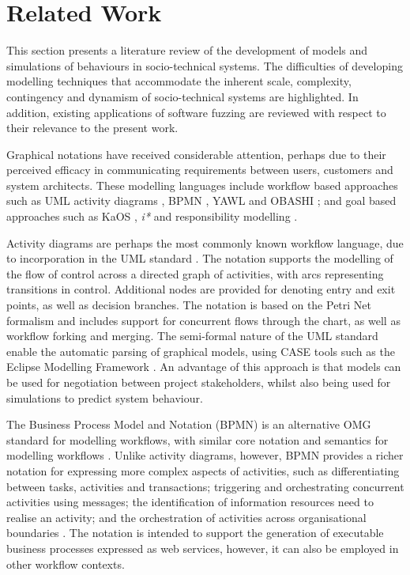 \documentclass{sig-alternate}
\begin{document}

\section{Related Work}

\label{sec:related}


This section presents a literature review of the development of models and
simulations of behaviours in socio-technical systems.  The difficulties of
developing modelling techniques that accommodate the inherent scale, complexity,
contingency and dynamism of socio-technical systems are highlighted.  In
addition, existing applications of software fuzzing are reviewed with respect to
their relevance to the present work.

Graphical notations have received considerable attention, perhaps due to their
perceived efficacy in communicating requirements between users, customers and
system architects.  These modelling languages include workflow based approaches
such as UML activity diagrams \citep{omg2010omguml}, BPMN \citep{omg2011omgbpmn},
YAWL \citep{hofstede2010yawl} and OBASHI \cite{obashimethodology}; and goal
based approaches such as KaOS \citep{Werneck2009}, \emph{i*} \citep{yu1995} and
responsibility modelling \citep{sommerville09responsibility}.

Activity diagrams are perhaps the most commonly known workflow language, due to
incorporation in the UML standard \citep{omg2010omguml}.  The notation supports
the modelling of the flow of control across a directed graph of activities, with
arcs representing transitions in control.  Additional nodes are provided for
denoting entry and exit points, as well as decision branches.  The notation is
based on the Petri Net formalism and includes support for concurrent flows
through the chart, as well as workflow forking and merging. The semi-formal
nature of the UML standard enable the automatic parsing of graphical models,
using CASE tools such as the Eclipse Modelling Framework \citep{EMFManual}.  An
advantage of this approach is that models can be used for negotiation between
project stakeholders, whilst also being used for simulations to predict system
behaviour.

The Business Process Model and Notation (BPMN) is an alternative OMG standard
for modelling workflows, with similar core notation and semantics for modelling
workflows \citep{omg2011omgbpmn}.  Unlike activity diagrams, however, BPMN
provides a richer notation for expressing more complex aspects of activities,
such as differentiating between tasks, activities and transactions; triggering
and orchestrating concurrent activities using messages; the identification of
information resources need to realise an activity; and the orchestration of
activities across organisational boundaries \citep{White2004}.  The notation is
intended to support the generation of executable business processes expressed as
web services, however, it can also be employed in other workflow contexts.
\end{document}
